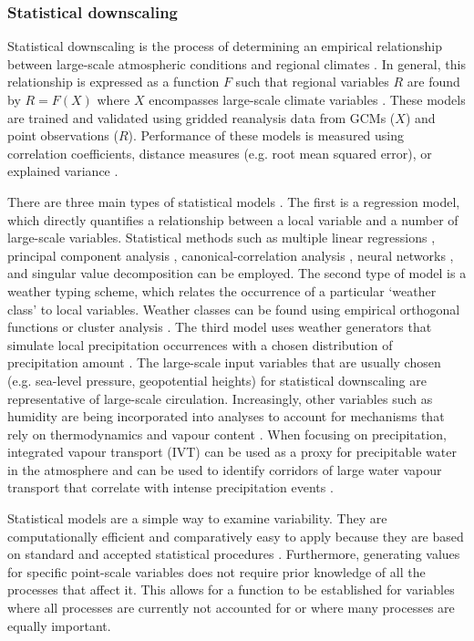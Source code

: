 \documentclass{sfuthesis}
\begin{document}
\subsubsection{Statistical downscaling}
Statistical downscaling is the process of determining an empirical relationship between large-scale atmospheric conditions and regional climates \citep{Fowler2007}. In general, this relationship is expressed as a function $F$ such that regional variables $R$ are found by $R=F(X)$ where $X$ encompasses large-scale climate variables \citep{Fowler2007}. These models are trained and validated using gridded reanalysis data from GCMs ($X$) and point observations ($R$). Performance of these models is measured using correlation coefficients, distance measures (e.g. root mean squared error), or explained variance \citep{Fowler2007}. 

There are three main types of statistical models \citep{Fowler2007}. The first is a regression model, which directly quantifies a relationship between a local variable and a number of large-scale variables. Statistical methods such as multiple linear regressions \citep{Hanssen-Bauer1998}, principal component analysis \citep{Kidson1998}, canonical-correlation analysis \citep{Busuioc2001}, neural networks \citep{Zorita1999}, and singular value decomposition \citep{Widmann2003} can be employed.  The second type of model is a weather typing scheme, which relates the occurrence of a particular `weather class' to local variables. Weather classes can be found using empirical orthogonal functions or cluster analysis \citep{Fowler2007}. The third model uses weather generators that simulate local precipitation occurrences with a chosen distribution of precipitation amount \citep{Fowler2007}. The large-scale input variables that are usually chosen (e.g. sea-level pressure, geopotential heights) for statistical downscaling are representative of large-scale circulation. Increasingly, other variables such as humidity are being incorporated into analyses to account for mechanisms that rely on thermodynamics and vapour content \citep{Fowler2007}. When focusing on precipitation, integrated vapour transport (IVT) can be used as a proxy for precipitable water in the atmosphere and can be used to identify corridors of large water vapour transport that correlate with intense precipitation events \citep{Neiman2008}. 

Statistical models are a simple way to examine variability. They are computationally efficient and comparatively easy to apply because they are based on standard and accepted statistical procedures \citep{Fowler2007}. Furthermore, generating values for specific point-scale variables does not require prior knowledge of all the processes that affect it. This allows for a function to be established for variables where all processes are currently not accounted for or where many processes are equally important. 
\end{document}
